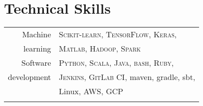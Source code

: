 \documentclass[10pt]{article} %
\begin{document}
{\begin{minipage}[t]{0.44\textwidth}
\begin{tabular}{rl}
\end{tabular}\\[10pt]


\vspace{0.5cm}
\section{Technical Skills}

\begin{tabular}{rl}
Machine & \textsc{Scikit-learn}, \textsc{TensorFlow}, \textsc{Keras},\\
learning & \textsc{Matlab}, \textsc{Hadoop}, \textsc{Spark}\\
\rule{0pt}{4ex}   
Software & \textsc{Python}, \textsc{Scala}, \textsc{Java}, \textsc{bash}, \textsc{Ruby},\\
development & \textsc{Jenkins}, \textsc{GitLab CI}, maven, gradle, sbt,\\
& Linux, \textsc{AWS}, \textsc{GCP}\\
& \\
\end{tabular}


\end{minipage} %

\newpage

\vspace*{2cm}

\begin{minipage}[t]{0.5\textwidth} %
\vspace{0pt} %




\end{minipage}}
\end{document}
